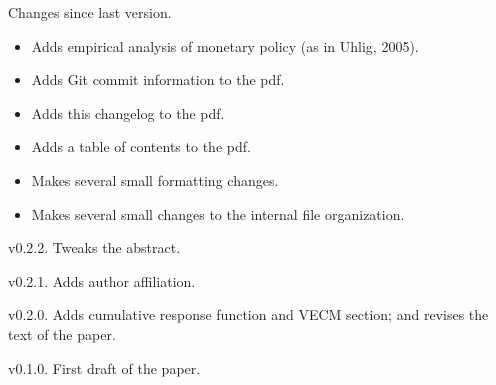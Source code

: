 \begin{description}
\item{Changes since last version.}
  \begin{itemize}[noitemsep]
  \item Adds empirical analysis of monetary policy (as in Uhlig, 2005).
  \item Adds Git commit information to the pdf.
  \item Adds this changelog to the pdf.
  \item Adds a table of contents to the pdf.
  \item Makes several small formatting changes.
  \item Makes several small changes to the internal file organization.
  \end{itemize}

\item{v0.2.2.} Tweaks the abstract.

\item{v0.2.1.} Adds author affiliation.

\item{v0.2.0.} Adds cumulative response function and VECM section; and
  revises the text of the paper.

\item{v0.1.0.} First draft of the paper.
\end{description}


